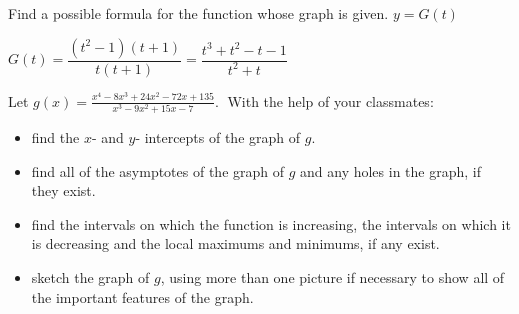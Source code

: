 \documentclass{ximera}
\begin{document}
\begin{problem}\label{rationalfromgraphlast}
Find a possible formula for the function whose graph is given.
$y = G(t)$


\begin{solution}
$G(t) = \dfrac{(t^2-1)(t+1)}{t(t+1)} = \dfrac{t^3+t^2-t-1}{t^2+t}$
\end{solution}

\end{problem}
 
\begin{problem}
Let $g(x) = \displaystyle \frac{x^{4} - 8x^{3} + 24x^{2} - 72x + 135}{x^{3} - 9x^{2} + 15x - 7}.\;$  With the help of your classmates:

\begin{itemize}

\item  find the $x$- and $y$- intercepts of the graph of $g$.

\item   find all of the asymptotes of the graph of $g$ and any holes in the graph, if they exist.

\item find the intervals on which the function is increasing, the intervals on which it is decreasing and the local maximums and minimums, if any exist.

\item sketch the graph of $g$, using more than one picture if necessary to show all of the important features of the graph.

\end{itemize}
\end{problem}
\end{document}
